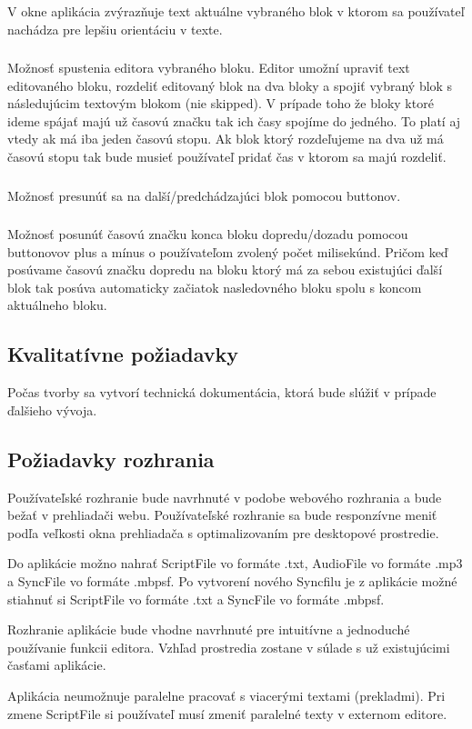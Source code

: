\documentclass{article}
\begin{document}
\subsubsection{}
V okne aplikácia zvýrazňuje text aktuálne vybraného blok v ktorom sa používateľ nachádza pre lepšiu orientáciu v texte.

\subsubsection{}
Možnosť spustenia editora vybraného bloku. Editor umožní upraviť text editovaného bloku, rozdeliť editovaný blok na dva bloky a spojiť vybraný blok s následujúcim textovým blokom (nie skipped). V prípade toho že bloky ktoré ideme spájať majú už časovú značku tak ich časy spojíme do jedného. To platí aj vtedy ak má iba jeden časovú stopu. Ak blok ktorý rozdeľujeme na dva už má časovú stopu tak bude musieť používateľ pridať čas v ktorom sa majú rozdeliť.

\subsubsection{}
Možnosť presunúť sa na další/predchádzajúci blok pomocou buttonov. 

\subsubsection{}
Možnosť posunúť časovú značku konca bloku dopredu/dozadu pomocou buttonovov plus a mínus o používateľom zvolený počet milisekúnd. Pričom keď posúvame časovú značku dopredu na bloku ktorý má za sebou existujúci ďalší blok tak posúva automaticky začiatok nasledovného bloku spolu s koncom aktuálneho bloku.

\subsection{Kvalitatívne požiadavky}
Počas tvorby sa vytvorí technická dokumentácia, ktorá bude slúžiť v prípade ďalšieho vývoja.

\subsection{Požiadavky rozhrania}
Používateľské rozhranie bude navrhnuté v podobe webového rozhrania a bude bežať v prehliadači webu. Používateľské rozhranie sa bude responzívne meniť podľa veľkosti okna prehliadača s optimalizovaním pre desktopové prostredie.

Do aplikácie možno nahrať ScriptFile vo formáte .txt, AudioFile vo formáte .mp3 a SyncFile vo formáte .mbpsf. Po vytvorení nového Syncfilu je z aplikácie možné stiahnuť si ScriptFile vo formáte .txt a SyncFile vo formáte .mbpsf.

Rozhranie aplikácie bude vhodne navrhnuté pre intuitívne a jednoduché používanie funkcii editora. Vzhľad prostredia zostane v súlade s už existujúcimi časťami aplikácie.

Aplikácia neumožnuje paralelne pracovať s viacerými textami (prekladmi). Pri zmene ScriptFile si používateľ musí zmeniť paralelné texty v externom editore.
\end{document}
